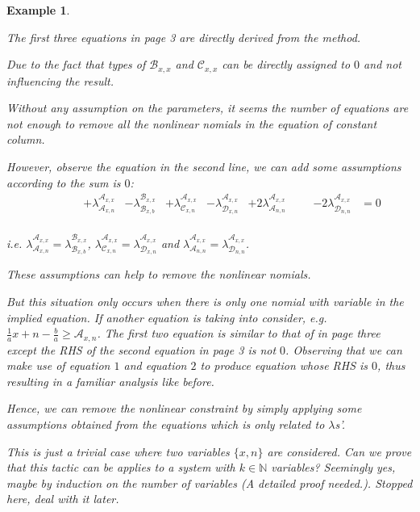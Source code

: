 \documentclass[a4paper,12pt]{article}
\newtheorem{example}{Example}
\newcommand{\cona}{\mathcal{A}}
\newcommand{\conb}{\mathcal{B}}
\newcommand{\conc}{\mathcal{C}}
\newcommand{\cond}{\mathcal{D}}
\begin{document}
\begin{example}
\begin{tiny}
\end{tiny}
The first three equations in page 3 are directly derived from the method.

Due to the fact that types of $\conb_{x,x}$ and $\conc_{x,x}$ can be directly assigned to $0$ and not influencing the result.

Without any assumption on the parameters, it seems the number of equations are not enough to remove all the nonlinear nomials in the equation of constant column.

However, observe the equation in the second line, we can add some assumptions according to the sum is $0$:
\begin{align*}
&&&&&+\lambda_{\cona_{x,n}}^{\cona_{x,x}} &- \lambda_{\conb_{x,b}}^{\conb_{x,x}} &+ \lambda_{\conc_{x,n}}^{\cona_{x,x}} &- \lambda_{\cond_{x,n}}^{\cona_{x,x}} &+ 2\lambda_{\cona_{n,n}}^{\cona_{x,x}} &&&- 2\lambda_{\cond_{n,n}}^{\cona_{x,x}} &= 0\\
\end{align*}


i.e. $\lambda_{\cona_{x,n}}^{\cona_{x,x}} = \lambda_{\conb_{x,b}}^{\conb_{x,x}}$,  $\lambda_{\conc_{x,n}}^{\cona_{x,x}} = \lambda_{\cond_{x,n}}^{\cona_{x,x}}$ and $\lambda_{\cona_{n,n}}^{\cona_{x,x}} = \lambda_{\cond_{n,n}}^{\cona_{x,x}}$.

These assumptions can help to remove the nonlinear nomials. 

But this situation only occurs when there is only one nomial with variable in the implied equation. If another equation is taking into consider, e.g. $\frac{1}{a}x+n -\frac{b}{a}\ge \cona_{x,n}$. The first two equation is similar to that of in page three except the RHS of the second equation in page 3 is not $0$. Observing that we can make use of equation $1$ and equation $2$ to produce equation whose RHS is $0$, thus resulting in a familiar analysis like before.

Hence, we can remove the nonlinear constraint by simply applying some assumptions obtained from the equations which is only related to $\lambda$s'.

This is just a trivial case where two variables $\{x,n\}$ are considered. Can we prove that this tactic can be applies to a system with $k\in\mathbb{N}$ variables? Seemingly yes, maybe by induction on the number of variables (A detailed proof needed.). Stopped here, deal with it later.




\end{example}
\end{document}
